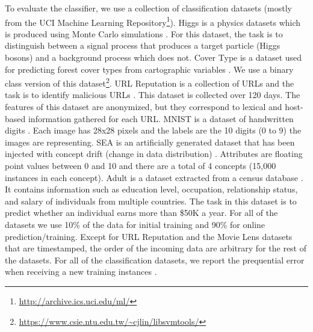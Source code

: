 \documentclass{vldb}
\begin{document}
To evaluate the classifier, we use a collection of classification datasets (mostly from the UCI Machine Learning Repository\footnote{\url{http://archive.ics.uci.edu/ml/}}).
Higgs is a physics datasets which is produced using Monte Carlo simulations \cite{baldi2014searching}.
For this dataset, the task is to distinguish between a signal process that produces a target particle (Higgs bosons) and a background process which does not.
Cover Type is a dataset used for predicting forest cover types from cartographic variables \cite{collobert2002parallel}.
We use a binary class version of this dataset\footnote{\url{https://www.csie.ntu.edu.tw/~cjlin/libsvmtools/}}.
URL Reputation is a collection of URLs and the task is to identify malicious URLs \cite{ma2009identifying}. 
This dataset is collected over 120 days.
The features of this dataset are anonymized, but they correspond to lexical and host-based information gathered for each URL.
MNIST is a dataset of handwritten digits \cite{lecun-mnist}.
Each image has 28x28 pixels and the labels are the 10 digits (0 to 9) the images are representing.
SEA is an artificially generated dataset that has been injected with concept drift (change in data distribution) \cite{street2001streaming}.
Attributes are floating point values between 0 and 10 and there are a total of 4 concepts (15,000 instances in each concept).
Adult is a dataset extracted from a census database \cite{platt199912}.
It contains information such as education level, occupation, relationship status, and salary of individuals from multiple countries.
The task in this dataset is to predict whether an individual earns more than \$50K a year. 
For all of the datasets we use 10\% of the data for initial training and 90\% for online prediction/training.
Except for URL Reputation and the Movie Lens datasets that are timestamped, the order of the incoming data are arbitrary for the rest of the datasets.
For all of the classification datasets, we report the prequential error when receiving a new training instances \cite{gama2009issues} .
\end{document}
